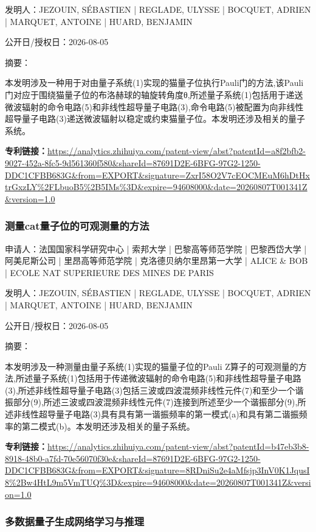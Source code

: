 \documentclass[12pt,a4paper]{ctexart}
\begin{document}
发明人：JEZOUIN, SÉBASTIEN | REGLADE, ULYSSE | BOCQUET, ADRIEN | MARQUET, ANTOINE | HUARD, BENJAMIN

公开日/授权日：2026-08-05

摘要：

本发明涉及一种用于对由量子系统(1)实现的猫量子位执行Pauli门的方法,该Pauli门对应于围绕猫量子位的布洛赫球的轴旋转角度θ,所述量子系统(1)包括用于递送微波辐射的命令电路(5)和非线性超导量子电路(3),命令电路(5)被配置为向非线性超导量子电路(3)递送微波辐射以稳定或约束猫量子位。本发明还涉及相关的量子系统。

\noindent\textbf{专利链接：}\url{https://analytics.zhihuiya.com/patent-view/abst?patentId=a8f2bfb2-9027-452a-8fc5-9d561360f580&shareId=87691D2E-6BFG-97G2-1250-DDC1CFBB683G&from=EXPORT&signature=ZxrI58O2V7cEOCMEuM6hDtHxtrGxzLY%2FLbuoB5%2B5IMs%3D&expire=94608000&date=20260807T001341Z&version=1.0}

\subsubsection{ 测量cat量子位的可观测量的方法 }

申请人：法国国家科学研究中心 | 索邦大学 | 巴黎高等师范学院 | 巴黎西岱大学 | 阿美尼斯公司 | 里昂高等师范学院 | 克洛德贝纳尔里昂第一大学 | ALICE \& BOB | ECOLE NAT SUPERIEURE DES MINES DE PARIS

发明人：JEZOUIN, SÉBASTIEN | REGLADE, ULYSSE | BOCQUET, ADRIEN | MARQUET, ANTOINE | HUARD, BENJAMIN

公开日/授权日：2026-08-05

摘要：

本发明涉及一种测量由量子系统(1)实现的猫量子位的Pauli Z算子的可观测量的方法,所述量子系统(1)包括用于传递微波辐射的命令电路(5)和非线性超导量子电路(3),所述非线性超导量子电路(3)包括三波或四波混频非线性元件(7)和至少一个谐振部分(9),所述三波或四波混频非线性元件(7)连接到所述至少一个谐振部分(9),所述非线性超导量子电路(3)具有具有第一谐振频率的第一模式(a)和具有第二谐振频率的第二模式(b)。本发明还涉及相关的量子系统。

\noindent\textbf{专利链接：}\url{https://analytics.zhihuiya.com/patent-view/abst?patentId=b47eb3b8-8918-48b0-a7fd-70e56070f30e&shareId=87691D2E-6BFG-97G2-1250-DDC1CFBB683G&from=EXPORT&signature=8RDniSu2e4aMfsjp3InV0K1JqusI8%2Bw4HtL9m5VmTUQ%3D&expire=94608000&date=20260807T001341Z&version=1.0}

\subsubsection{ 多数据量子生成网络学习与推理 }
\end{document}
